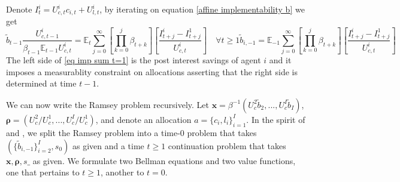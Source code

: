 \documentclass[thmsb,11pt]{article}
\begin{document}
 Denote $I^i_t=U^i_{c,t}c_{i,t}+U^i_{l,t}$, by iterating on equation \eqref{affine implementability b} we get
 \begin{subequations}

 \begin{equation}
 \label{eq imp sum t=1}
  \tilde{b}_{t-1}\frac{U^i_{c,t-1}}{\beta_{t-1} \mathbb{E}_{t-1} U^i_{c,t}}=\mathbb{E}_t\sum^{\infty}_{j=0}\left[\prod^{j}_{k=0}\beta_{t+k}\right]\left[\frac{I^i_{t+j}-I^1_{t+j}}{U^i_{c,t}}\right] \quad \forall t \geq 1
 \end{equation}
 \begin{equation}
 \label{eq imp sum t=0}
  \tilde{b}_{i,-1}=\mathbb{E}_{-1}\sum^{\infty}_{j=0}\left[\prod^{j}_{k=0}\beta_{t+k}\right]\left[\frac{I^i_{t+j}-I^1_{t+j}}{U^i_{c,t}}\right]
 \end{equation}

\end{subequations}
The left  side of \eqref{eq imp sum t=1} is the post interest savings of agent $i$  and it imposes a measurablity constraint on  allocations asserting  that the right side is determined at time $t-1$.


 We can now write the Ramsey problem recursively. Let $\bm{x}= \beta^{-1}\left( U_{c}^{2}\tilde{b}_{2},...,U_{c}^{I}\tilde{b}_{I}\right)$, $\bm{\rho }=\left( U_{c}^{2}/U_{c}^{1},...,U_{c}^{I}/U_{c}^{1}\right) $, and denote an allocation $a=\{c_i,l_i\}^{I}_{i=1}.$
In the spirit of \cite{Kydland1980} and \cite{Farhi2010}, we split the Ramsey problem into a time-$0$ problem that takes $(\{\tilde{b}_{i,-1}\}^{I}_{i=2}, s_0)$ as given and   a time $t \geq 1$ continuation problem  that takes $\bm x,\bm \rho,s\_$ as given. We formulate
two Bellman equations and two value functions, one that pertains to $t\geq 1$, another to $t=0$.
\end{document}
